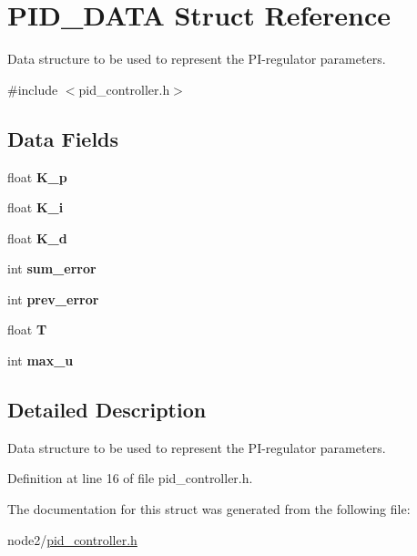 \hypertarget{structPID__DATA}{}\section{P\+I\+D\+\_\+\+D\+A\+TA Struct Reference}
\label{structPID__DATA}


Data structure to be used to represent the P\+I-\/regulator parameters.  




{\ttfamily \#include $<$pid\+\_\+controller.\+h$>$}

\subsection*{Data Fields}
\begin{DoxyCompactItemize}
\item 
\mbox{\label{structPID__DATA_aaa1a7edcc47f8fb20a0ed8ce6c50794e}} 
float {\bfseries K\+\_\+p}
\item 
\mbox{\label{structPID__DATA_acdea1309ca050514dc9ec0372a48cef5}} 
float {\bfseries K\+\_\+i}
\item 
\mbox{\label{structPID__DATA_a34eeea6562e4c200ecbefbc2d6e82c66}} 
float {\bfseries K\+\_\+d}
\item 
\mbox{\label{structPID__DATA_a2faf4902ee531d4dd95d52832ce892ea}} 
int {\bfseries sum\+\_\+error}
\item 
\mbox{\label{structPID__DATA_af1a40417fd48fed388ebd241c9efdca9}} 
int {\bfseries prev\+\_\+error}
\item 
\mbox{\label{structPID__DATA_ab33028ecd617bcd7b8f5a2b13f7fb6bd}} 
float {\bfseries T}
\item 
\mbox{\label{structPID__DATA_a3e809b06f4db55cbe102576b89c19e21}} 
int {\bfseries max\+\_\+u}
\end{DoxyCompactItemize}


\subsection{Detailed Description}
Data structure to be used to represent the P\+I-\/regulator parameters. 

Definition at line 16 of file pid\+\_\+controller.\+h.



The documentation for this struct was generated from the following file\+:\begin{DoxyCompactItemize}
\item 
node2/\hyperlink{pid__controller_8h}{pid\+\_\+controller.\+h}\end{DoxyCompactItemize}
